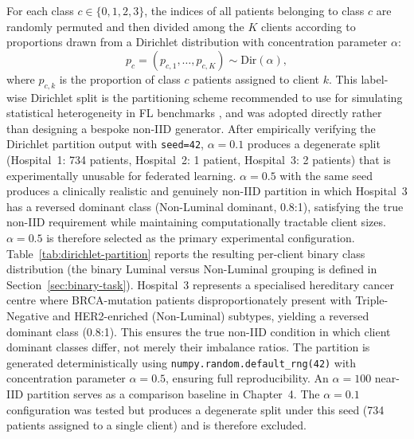 For each class $c \in \{0,1,2,3\}$, the indices of all
patients belonging to class $c$ are randomly permuted and
then divided among the $K$ clients according to proportions
drawn from a Dirichlet distribution with concentration
parameter $\alpha$:
\begin{equation}
  p_c = (p_{c,1}, \ldots, p_{c,K})
  \sim \mathrm{Dir}(\alpha),
  \label{eq:dirichlet}
\end{equation}
where $p_{c,k}$ is the proportion of class $c$ patients
assigned to client $k$.
This label-wise Dirichlet split is the partitioning scheme
recommended to use for simulating statistical heterogeneity in FL
benchmarks \cite{kairouz2021advances}, and was adopted directly
rather than designing a bespoke non-IID generator.
After empirically verifying the Dirichlet partition
output with \texttt{seed=42}, $\alpha=0.1$ produces
a degenerate split (Hospital~1: 734 patients,
Hospital~2: 1 patient, Hospital~3: 2 patients) that
is experimentally unusable for federated learning.
$\alpha = 0.5$ with the same seed produces a clinically
realistic and genuinely non-IID partition in which
Hospital~3 has a reversed dominant class
(Non-Luminal dominant, 0.8:1), satisfying the
true non-IID requirement while maintaining
computationally tractable client sizes.
$\alpha = 0.5$ is therefore selected as the primary
experimental configuration.
Table~\ref{tab:dirichlet-partition} reports the
resulting per-client binary class distribution
(the binary Luminal versus Non-Luminal grouping
is defined in Section~\ref{sec:binary-task}).
Hospital~3 represents a specialised hereditary
cancer centre where BRCA-mutation patients
disproportionately present with Triple-Negative
and HER2-enriched (Non-Luminal) subtypes, yielding
a reversed dominant class (0.8:1).
This ensures the true non-IID condition in which
client dominant classes differ, not merely their
imbalance ratios.
The partition is generated deterministically
using \texttt{numpy.random.default\_rng(42)}
with concentration parameter $\alpha = 0.5$,
ensuring full reproducibility.
An $\alpha=100$ near-IID partition serves as
a comparison baseline in Chapter~4.
The $\alpha=0.1$ configuration was tested but
produces a degenerate split under this seed
(734 patients assigned to a single client)
and is therefore excluded.


